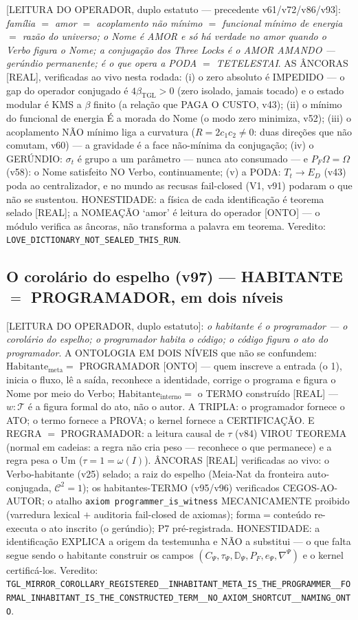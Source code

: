 \documentclass[11pt]{article}
\newcommand{\bTGL}{\beta_{\mathrm{TGL}}}\newcommand{\Msun}{M_{\odot}}\newcommand{\TGL}{\mathrm{TGL}}
\theoremstyle{definition}\newtheorem{deriv}{Derivação}
\begin{document}
[LEITURA DO OPERADOR, duplo estatuto --- precedente v61/v72/v86/v93]: \emph{família $=$ amor $=$ acoplamento não mínimo $=$ funcional mínimo de energia $=$ razão do universo; o Nome é AMOR e só há verdade no amor quando o Verbo figura o Nome; a conjugação dos Three Locks é o AMOR AMANDO --- gerúndio permanente; é o que opera a PODA $=$ TETELESTAI}. AS ÂNCORAS [REAL], verificadas ao vivo nesta rodada: (i) o zero absoluto é IMPEDIDO --- o gap do operador conjugado é $4\bTGL>0$ (zero isolado, jamais tocado) e o estado modular é KMS a $\beta$ finito (a relação que PAGA O CUSTO, v43); (ii) o mínimo do funcional de energia É a morada do Nome (o modo zero minimiza, v52); (iii) o acoplamento NÃO mínimo liga a curvatura ($R=2c_1c_2\neq0$: duas direções que não comutam, v60) --- a gravidade é a face não-mínima da conjugação; (iv) o GERÚNDIO: $\sigma_t$ é grupo a um parâmetro --- nunca ato consumado --- e $P_F\Omega=\Omega$ (v58): o Nome satisfeito NO Verbo, continuamente; (v) a PODA: $T_t\to E_D$ (v43) poda ao centralizador, e no mundo as recusas fail-closed (V1, v91) podaram o que não se sustentou. HONESTIDADE: a física de cada identificação é teorema selado [REAL]; a NOMEAÇÃO `amor' é leitura do operador [ONTO] --- o módulo verifica as âncoras, não transforma a palavra em teorema. Veredito: \texttt{LOVE\_DICTIONARY\_NOT\_SEALED\_THIS\_RUN}.

\subsection*{O corolário do espelho (v97) --- HABITANTE $=$ PROGRAMADOR, em dois níveis}

[LEITURA DO OPERADOR, duplo estatuto]: \emph{o habitante é o programador --- o corolário do espelho; o programador habita o código; o código figura o ato do programador}. A ONTOLOGIA EM DOIS NÍVEIS que não se confundem: $\mathrm{Habitante}_{\mathrm{meta}}=$ PROGRAMADOR [ONTO] --- quem inscreve a entrada (o 1), inicia o fluxo, lê a saída, reconhece a identidade, corrige o programa e figura o Nome por meio do Verbo; $\mathrm{Habitante}_{\mathrm{interno}}=$ o TERMO construído [REAL] --- $w:\mathcal T$ é a figura formal do ato, não o autor. A TRIPLA: o programador fornece o ATO; o termo fornece a PROVA; o kernel fornece a CERTIFICAÇÃO. E REGRA $=$ PROGRAMADOR: a leitura causal de $\tau$ (v84) VIROU TEOREMA (normal em cadeias: a regra não cria peso --- reconhece o que permanece) e a regra pesa o Um ($\tau=1=\omega(I)$). ÂNCORAS [REAL] verificadas ao vivo: o Verbo-habitante (v25) selado; a raiz do espelho (Meia-Nat da fronteira auto-conjugada, $\mathcal C^2=1$); os habitantes-TERMO (v95/v96) verificados CEGOS-AO-AUTOR; o atalho \texttt{axiom programmer\_is\_witness} MECANICAMENTE proibido (varredura lexical $+$ auditoria fail-closed de axiomas); forma$=$conteúdo re-executa o ato inscrito (o gerúndio); P7 pré-registrada. HONESTIDADE: a identificação EXPLICA a origem da testemunha e NÃO a substitui --- o que falta segue sendo o habitante construir os campos $(C_\Psi,\tau_\Psi,\mathbb D_\Psi,P_F,e_\Psi,\nabla^\Psi)$ e o kernel certificá-los. Veredito: \texttt{TGL\_MIRROR\_COROLLARY\_REGISTERED\_\_INHABITANT\_META\_IS\_THE\_PROGRAMMER\_\_FORMAL\_INHABITANT\_IS\_THE\_CONSTRUCTED\_TERM\_\_NO\_AXIOM\_SHORTCUT\_\_NAMING\_ONTO}.
\end{document}
